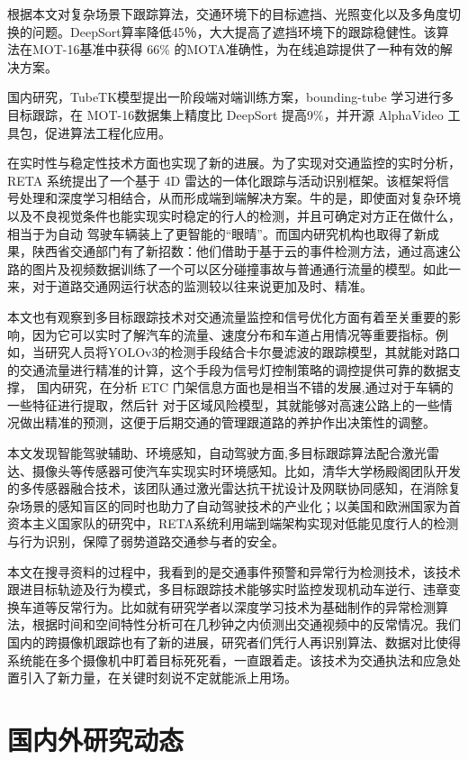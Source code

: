 根据本文对复杂场景下跟踪算法，交通环境下的目标遮挡、光照变化以及多角度切换的问题。DeepSort算率降低45％，大大提高了遮挡环境下的跟踪稳健性。该算法在MOT-16基准中获得 66\% 的MOTA准确性，为在线追踪提供了一种有效的解决方案。

国内研究，TubeTK模型提出一阶段端对端训练方案，bounding-tube 学习进行多目标跟踪，在 MOT-16数据集上精度比 DeepSort 提高9\%，并开源 AlphaVideo 工具包，促进算法工程化应用。

在实时性与稳定性技术方面也实现了新的进展。为了实现对交通监控的实时分析，RETA 系统\cite{zhang2023reta}提出了一个基于 4D 雷达的一体化跟踪与活动识别框架。该框架将信号处理和深度学习相结合，从而形成端到端解决方案。牛的是，即使面对复杂环境以及不良视觉条件也能实现实时稳定的行人的检测，并且可确定对方正在做什么，相当于为自动 驾驶车辆装上了更智能的“眼晴”。而国内研究机构也取得了新成果，陕西省交通部门有了新招数：他们借助于基于云的事件检测方法，通过高速公路的图片及视频数据训练了一个可以区分碰撞事故与普通通行流量的模型。如此一来，对于道路交通网运行状态的监测较以往来说更加及时、精准。

本文也有观察到多目标跟踪技术对交通流量监控和信号优化方面有着至关重要的影响，因为它可以实时了解汽车的流量、速度分布和车道占用情况等重要指标。例如，当研究人员将YOLOv3的检测手段结合卡尔曼滤波的跟踪模型，其就能对路口的交通流量进行精准的计算，这个手段为信号灯控制策略的调控提供可靠的数据支撑， 国内研究，在分析 ETC 门架信息方面也是相当不错的发展,通过对于车辆的一些特征进行提取，然后针 对于区域风险模型，其就能够对高速公路上的一些情况做出精准的预测，这便于后期交通的管理跟道路的养护作出决策性的调整。

本文发现智能驾驶辅助、环境感知，自动驾驶方面,多目标跟踪算法配合激光雷达、摄像头等传感器可使汽车实现实时环境感知。比如，清华大学杨殿阁团队开发的多传感器融合技术，该团队通过激光雷达抗干扰设计及网联协同感知，在消除复杂场景的感知盲区的同时也助力了自动驾驶技术的产业化；以美国和欧洲国家为首资本主义国家队的研究中，RETA系统利用端到端架构实现对低能见度行人的检测与行为识别，保障了弱势道路交通参与者的安全。

本文在搜寻资料的过程中，我看到的是交通事件预警和异常行为检测技术，该技术跟进目标轨迹及行为模式，多目标跟踪技术能够实时监控发现机动车逆行、违章变换车道等反常行为。比如就有研究学者以深度学习技术为基础制作的异常检测算法，根据时间和空间特性分析可在几秒钟之内侦测出交通视频中的反常情况。我们国内的跨摄像机跟踪也有了新的进展，研究者们凭行人再识别算法、数据对比使得系统能在多个摄像机中盯着目标死死看，一直跟着走。该技术为交通执法和应急处置引入了新力量，在关键时刻说不定就能派上用场。

\section{国内外研究动态}

